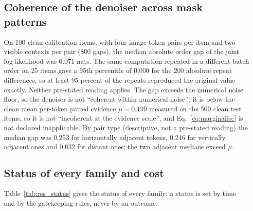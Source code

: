 \subsection{Coherence of the denoiser across mask patterns}\label{ssec:res_coh}
On 100 clean calibration items, with four image-token pairs per item and two visible contexts per pair (800 gaps), the median absolute
order gap of the joint log-likelihood was 0.071 nats.
The same computation repeated in a different batch order on 25 items gave a 95th percentile of 0.000 for the 200 absolute repeat
differences, so at least 95 percent of the repeats reproduced the original value exactly.
Neither pre-stated reading applies.
The gap exceeds the numerical noise floor, so the denoiser is not ``coherent within numerical noise''; it is below the clean mean
per-token paired evidence $\mu=0.199$ measured on the 500 clean test items, so it is not ``incoherent at the evidence scale'', and
Eq.~\eqref{eq:marginalise} is not declared inapplicable.
By pair type (descriptive, not a pre-stated reading) the median gap was 0.253 for horizontally adjacent tokens, 0.246 for vertically
adjacent ones and 0.032 for distant ones; the two adjacent medians exceed $\mu$.

\subsection{Status of every family and cost}\label{ssec:res_cost}
Table~\ref{tab:res_status} gives the status of every family; a status is set by time and by the gatekeeping rules, never by an outcome.


